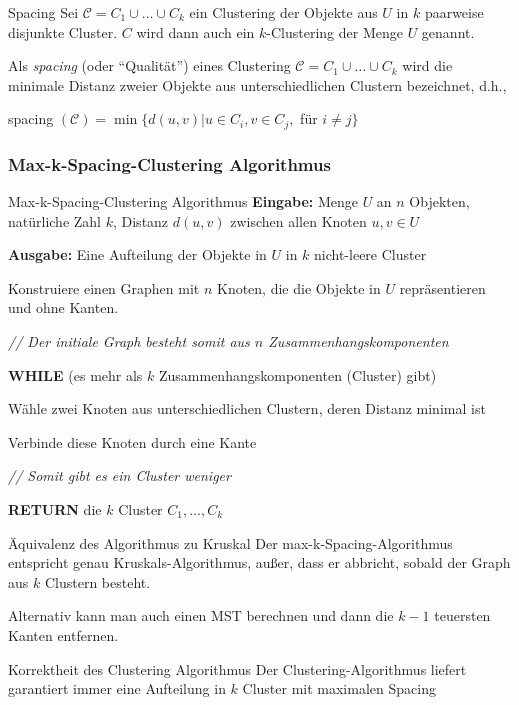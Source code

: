 \documentclass{panikzettel}
\newcommand\tab[1][1cm]{\hspace*{#1}}
\newcommand{\boxspace}{	\vspace{-\baselineskip}	}
\begin{document}
\begin{defi}{Spacing}
	Sei $\mathcal{C} = C_1 \cup \dots \cup C_k$ ein Clustering der Objekte aus $U$ in $k$ paarweise disjunkte Cluster. $C$ wird dann auch ein $k$-Clustering der Menge $U$ genannt.
	
	Als \emph{spacing} (oder ``Qualität'') eines Clustering $\mathcal{C} = C_1 \cup \dots \cup C_k$ wird die minimale Distanz zweier Objekte aus unterschiedlichen Clustern bezeichnet, d.h.,
	
	\centering spacing $(\mathcal{C}) = \min \{d(u,v) | u \in C_i, v \in C_j,$ für $i \neq j \}$
\end{defi}


\subsubsection{Max-k-Spacing-Clustering Algorithmus}

\begin{algo}{Max-k-Spacing-Clustering Algorithmus}
	\textbf{Eingabe:} Menge $U$ an $n$ Objekten, natürliche Zahl $k$, Distanz $d(u,v)$ zwischen allen Knoten $u,v \in U$
	
	\textbf{Ausgabe:} Eine Aufteilung der Objekte in $U$ in $k$ nicht-leere Cluster
	
	\tcblower
	
	Konstruiere einen Graphen mit $n$ Knoten, die die Objekte in $U$ repräsentieren und ohne Kanten.
	
	\textit{ \color{gray} // Der initiale Graph besteht somit aus $n$ Zusammenhangskomponenten }
	
	\textbf{WHILE} (es mehr als $k$ Zusammenhangskomponenten (Cluster) gibt)
	
	\tab Wähle zwei Knoten aus unterschiedlichen Clustern, deren Distanz minimal ist
	
	\tab Verbinde diese Knoten durch eine Kante
	
	\tab \textit{ \color{gray} // Somit gibt es ein Cluster weniger }
	
	\textbf{RETURN} die $k$ Cluster $C_1, \dots, C_k$
\end{algo}

\begin{halfboxl}
	\boxspace
	
	\begin{theo}{Äquivalenz des Algorithmus zu Kruskal}
		Der max-k-Spacing-Algorithmus entspricht genau Kruskals-Algorithmus, außer, dass er abbricht, sobald der Graph aus $k$ Clustern besteht.
		
		Alternativ kann man auch einen MST berechnen und dann die $k-1$ teuersten Kanten entfernen.
	\end{theo}
\end{halfboxl}%
\begin{halfboxr}
	\boxspace
	
	\begin{theo}{Korrektheit des Clustering Algorithmus}
		Der Clustering-Algorithmus liefert garantiert immer eine Aufteilung in $k$ Cluster mit maximalen Spacing
	\end{theo}
\end{halfboxr}
\end{document}
